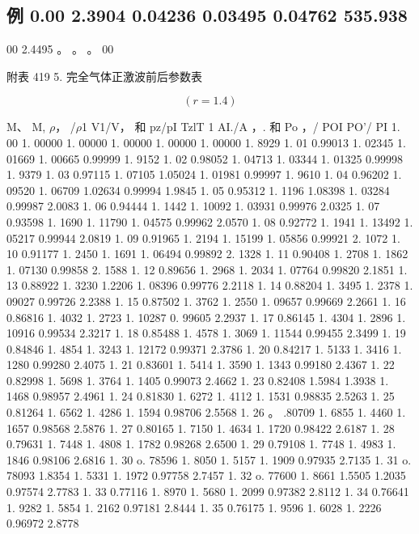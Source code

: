 \subsection*{例 0.00  2.3904 0.04236 0.03495 0.04762 535.938}

00 2.4495 。 。 。 00

附表 419 5. 完全气体正激波前后参数表

\[(r= 1. 4)\]

M、 M, $\rho$， /$\rho$1 V1/V， 和 pz/pI TzlT 1 AI./A ，. 和 Po ，/ POI PO'/ PI 1. 00 1. 00000 1. 00000 1. 00000 1. 00000 1. 00000 1. 8929 1. 01 0.99013 1. 02345 1. 01669 1. 00665 0.99999 1. 9152 1. 02 0.98052 1. 04713 1. 03344 1. 01325 0.99998 1. 9379 1. 03 0.97115 1. 07105 1.05024 1. 01981 0.99997 1. 9610 1. 04 0.96202 1. 09520 1. 06709 1.02634 0.99994 1.9845 1. 05 0.95312 1. 1196 1.08398 1. 03284 0.99987 2.0083 1. 06 0.94444 1. 1442 1. 10092 1. 03931 0.99976 2.0325 1. 07 0.93598 1. 1690 1. 11790 1. 04575 0.99962 2.0570 1. 08 0.92772 1. 1941 1. 13492 1. 05217 0.99944 2.0819 1. 09 0.91965 1. 2194 1. 15199 1. 05856 0.99921 2. 1072 1. 10 0.91177 1. 2450 1. 1691 1. 06494 0.99892 2. 1328 1. 11 0.90408 1. 2708 1. 1862 1. 07130 0.99858 2. 1588 1. 12 0.89656 1. 2968 1. 2034 1. 07764 0.99820 2.1851 1. 13 0.88922 1. 3230 1.2206 1. 08396 0.99776 2.2118 1. 14 0.88204 1. 3495 1. 2378 1. 09027 0.99726 2.2388 1. 15 0.87502 1. 3762 1. 2550 1. 09657 0.99669 2.2661 1. 16 0.86816 1. 4032 1. 2723 1. 10287 0. 99605 2.2937 1. 17 0.86145 1. 4304 1. 2896 1. 10916 0.99534 2.3217 1. 18 0.85488 1. 4578 1. 3069 1. 11544 0.99455 2.3499 1. 19 0.84846 1. 4854 1. 3243 1. 12172 0.99371 2.3786 1. 20 0.84217 1. 5133 1. 3416 1. 1280 0.99280 2.4075 1. 21 0.83601 1. 5414 1. 3590 1. 1343 0.99180 2.4367 1. 22 0.82998 1. 5698 1. 3764 1. 1405 0.99073 2.4662 1. 23 0.82408 1.5984 1.3938 1. 1468 0.98957 2.4961 1. 24 0.81830 1. 6272 1. 4112 1. 1531 0.98835 2.5263 1. 25 0.81264 1. 6562 1. 4286 1. 1594 0.98706 2.5568 1. 26 。 .80709 1. 6855 1. 4460 1. 1657 0.98568 2.5876 1. 27 0.80165 1. 7150 1. 4634 1. 1720 0.98422 2.6187 1. 28 0.79631 1. 7448 1. 4808 1. 1782 0.98268 2.6500 1. 29 0.79108 1. 7748 1. 4983 1. 1846 0.98106 2.6816 1. 30 o. 78596 1. 8050 1. 5157 1. 1909 0.97935 2.7135 1. 31 o. 78093 1.8354 1. 5331 1. 1972 0.97758 2.7457 1. 32 o. 77600 1. 8661 1.5505 1.2035 0.97574 2.7783 1. 33 0.77116 1. 8970 1. 5680 1. 2099 0.97382 2.8112 1. 34 0.76641 1. 9282 1. 5854 1. 2162 0.97181 2.8444 1. 35 0.76175 1. 9596 1. 6028 1. 2226 0.96972 2.8778


